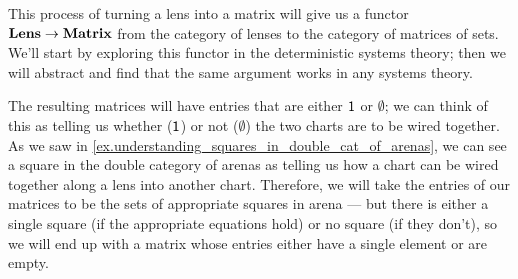 \documentclass[DynamicalBook]{subfiles}
\begin{document}
This process of turning a lens into a matrix will give us a functor $\textbf{Lens}
\to \textbf{Matrix}$ from the category of lenses to the category of matrices of
sets. We'll start by exploring this functor in the deterministic systems theory; then
we will abstract and find that the same argument works in any systems theory.

The resulting matrices will have entries that are either $\mathsf{1}$ or
$\emptyset$; we can think of this as telling us whether ($\mathsf{1}$) or not ($\emptyset$) the two charts
are to be wired together. As we saw in
\cref{ex.understanding_squares_in_double_cat_of_arenas}, we can see a square in the double
category of arenas as telling us how a chart can be wired together along
a lens into another chart. Therefore, we will take the entries of our matrices
to be the sets of appropriate squares in arena --- but there is either a single
square (if the appropriate equations hold) or no square (if they don't), so we
will end up with a matrix whose entries either have a single element or are empty.
\end{document}
